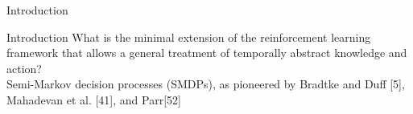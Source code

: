 \begin{frame}{Introduction}
\begin{itemize}
\begin{itemize}
        \end{itemize}
    \end{itemize}
\end{frame}

\begin{frame}{Introduction}
    What is the minimal extension of the reinforcement learning framework that allows a general treatment of temporally abstract knowledge and action?
    \pause
    \\
    
    
    Semi-Markov decision processes (SMDPs), as pioneered by Bradtke and Duff [5],  Mahadevan et al. [41], and Parr[52]
\end{frame}

